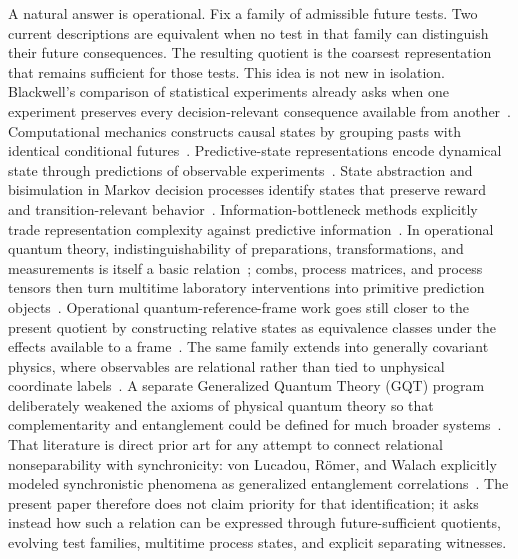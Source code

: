\documentclass[11pt]{article}
\begin{document}
A natural answer is operational. Fix a family of admissible future tests. Two current descriptions are equivalent when no test in that family can distinguish their future consequences. The resulting quotient is the coarsest representation that remains sufficient for those tests. This idea is not new in isolation. Blackwell's comparison of statistical experiments already asks when one experiment preserves every decision-relevant consequence available from another~\cite{blackwell1953}. Computational mechanics constructs causal states by grouping pasts with identical conditional futures~\cite{crutchfield1989,shalizi2001}. Predictive-state representations encode dynamical state through predictions of observable experiments~\cite{littman2001,singh2004}. State abstraction and bisimulation in Markov decision processes identify states that preserve reward and transition-relevant behavior~\cite{givan2003,ferns2011}. Information-bottleneck methods explicitly trade representation complexity against predictive information~\cite{tishby1999,creutzig2009,still2012}. In operational quantum theory, indistinguishability of preparations, transformations, and measurements is itself a basic relation~\cite{spekkens2005}; combs, process matrices, and process tensors then turn multitime laboratory interventions into primitive prediction objects~\cite{chiribella2008,chiribella2009,oreshkov2012,pollock2018pra,pollock2018prl,costa2016}. Operational quantum-reference-frame work goes still closer to the present quotient by constructing relative states as equivalence classes under the effects available to a frame~\cite{glowacki2023,carette2025}. The same family extends into generally covariant physics, where observables are relational rather than tied to unphysical coordinate labels~\cite{rovelli2002,dittrich2006,giacomini2019,vanrietvelde2020,thiemann2026}. A separate Generalized Quantum Theory (GQT) program deliberately weakened the axioms of physical quantum theory so that complementarity and entanglement could be defined for much broader systems~\cite{atmanspacher2002,filkromer2011}. That literature is direct prior art for any attempt to connect relational nonseparability with synchronicity: von Lucadou, Römer, and Walach explicitly modeled synchronistic phenomena as generalized entanglement correlations~\cite{lucadou2007}. The present paper therefore does not claim priority for that identification; it asks instead how such a relation can be expressed through future-sufficient quotients, evolving test families, multitime process states, and explicit separating witnesses.
\end{document}

